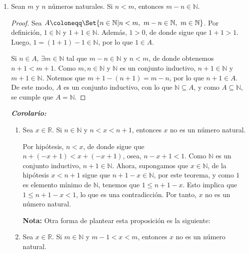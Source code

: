 \documentclass[11pt]{article}
\newcommand{\N}{\mathbb{N}}
\newcommand{\R}{\mathbb{R}}
\newcommand{\bfit}[1]{\textbf{\textit{#1}}}
\let\set\Set
\begin{document}
\begin{enumerate}[label=\alph*)]
    \item Sean $m$ y $n$ números naturales. Si $n<m$, entonces $m-n\in\N$.
    \vspace{-1em}\begin{proof} 
        Sea $A \coloneqq \set{n\in \N| n<m, \ m-n\in\N, \ m\in \N}$. Por definición, $1\in \N$ y $1+1\in \N$. Además, $1>0$, de donde sigue que $1+1>1$. Luego, $1=(1+1)-1\in \N$, por lo que $1\in A$. 

        Si $n \in A$, $\exists m\in \N$ tal que $m-n\in \N$ y $n<m$, de donde obtenemos $n+1<m+1$. Como $m,n\in \N$ y $\N$ es un conjunto inductivo, $n+1\in \N$ y $m+1 \in \N$. Notemos que $m+1-(n+1)=m-n$, por lo que $n+1\in A$. De este modo, $A$ es un conjunto inductivo, con lo que $\N \subseteq A$, y como $A\subseteq \N$, se cumple que $A=\N$.
    \end{proof} \vspace{-1em}

    \bfit{Corolario:} \begin{enumerate}[label=\roman*)]
        \item Sea $x\in \R$. Si $n\in \N$ y $n<x<n+1$, entonces $x$ no es un número natural.
        
        Por hipótesis, $n<x$, de donde sigue que $n+(-x+1)<x+(-x+1)$, osea, $n-x+1<1$. Como $\N$ es un conjunto inductivo, $n+1\in \N$. Ahora, supongamos que $x\in \N$, de la hipótesis $x<n+1$ sigue que $n+1-x\in \N$, por este teorema, y como $1$ es elemento mínimo de $\N$, tenemos que $1\leq n+1-x$. Esto implica que $1\leq n+1-x < 1$, lo que es una contradicción. Por tanto, $x$ no es un número natural.

        \textbf{Nota:} Otra forma de plantear esta proposición es la siguiente:

        \item Sea $x\in \R$. Si $m\in \N$ y $m-1<x<m$, entonces $x$ no es un número natural.
        

\end{enumerate}
\end{enumerate}
\end{document}
